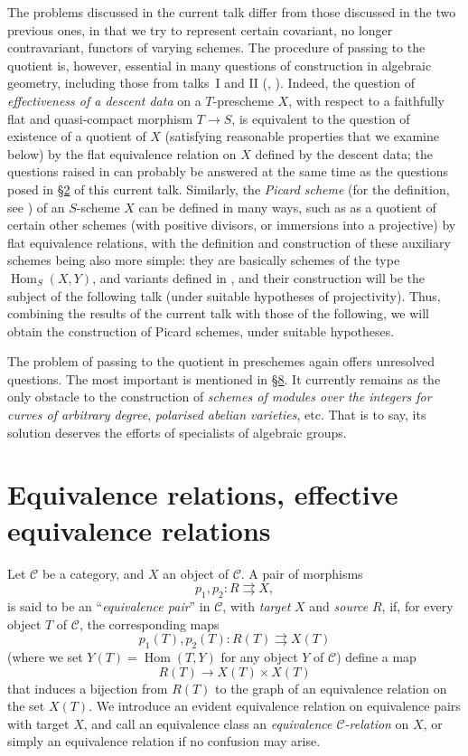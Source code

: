 \documentclass{article}
\renewcommand{\cal}[1]{{\mathcal{#1}}}
\DeclareMathOperator{\Hom}{Hom}
\newcommand{\oldpage}[1]{\marginpar{\footnotesize$\Big\vert$ \textit{p.~#1}}}
\begin{document}
The problems discussed in the current talk differ from those discussed in the two previous ones, in that we try to represent certain covariant, no longer contravariant, functors of varying schemes.
The procedure of passing to the quotient is, however, essential in many questions of construction in algebraic geometry, including those from talks~I and II (\cite{1}, \cite{2}).
Indeed, the question of \emph{effectiveness of a descent data} on a $T$-prescheme $X$, with respect to a faithfully flat and quasi-compact morphism $T\to S$, is equivalent to the question of existence of a quotient of $X$ (satisfying reasonable properties that we examine below) by the flat equivalence relation on $X$ defined by the descent data;
the questions raised in \cite[A.2.c]{1} can probably be answered at the same time as the questions posed in \hyperref[2]{\S2} of this current talk.
Similarly, the \emph{Picard scheme} (for the definition, see \cite[C.3]{2}) of an $S$-scheme $X$ can be defined in many ways, such as as a quotient of certain other schemes (with positive divisors, or immersions into a projective) by flat equivalence relations, with the definition and construction of these auxiliary schemes being also more simple: they are basically schemes of the type $\Hom_S(X,Y)$, and variants defined in \cite[C.2]{2}, and their construction will be the subject of the following talk (under suitable hypotheses of projectivity).
Thus, combining the results of the current talk with those of the following, we will obtain the construction of Picard schemes, under suitable hypotheses.

The problem of passing to the quotient in preschemes again offers unresolved questions.
The most important is mentioned in \hyperref[8]{\S8}.
It currently remains as the only obstacle to the construction of \emph{schemes of modules over the integers for curves of arbitrary degree}, \emph{polarised abelian varieties}, etc.
That is to say, its solution deserves the efforts of specialists of algebraic groups.


\oldpage{212-02}
\section{Equivalence relations, effective equivalence relations}

Let $\cal{C}$ be a category, and $X$ an object of $\cal{C}$.
A pair of morphisms
\[
  p_1,p_2\colon R\rightrightarrows X,
\]
is said to be an ``\emph{equivalence pair}'' in $\cal{C}$, with \emph{target} $X$ and \emph{source} $R$, if, for every object $T$ of $\cal{C}$, the corresponding maps
\[
  p_1(T),p_2(T)\colon R(T)\rightrightarrows X(T)
\]
(where we set $Y(T)=\Hom(T,Y)$ for any object $Y$ of $\cal{C}$) define a map
\[
  R(T)\to X(T)\times X(T)
\]
that induces a bijection from $R(T)$ to the graph of an equivalence relation on the set $X(T)$.
We introduce an evident equivalence relation on equivalence pairs with target $X$, and call an equivalence class an \emph{equivalence $\cal{C}$-relation} on $X$, or simply an equivalence relation if no confusion may arise.
\end{document}
